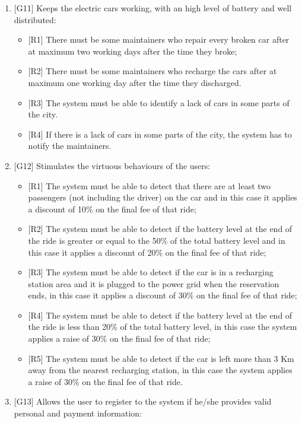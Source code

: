\begin{enumerate}
\item {[G11]} Keeps the electric cars working, with an high level of battery and well distributed:

\begin{itemize}
	\item {[R1]} There must be some maintainers who repair every broken car after at maximum two working days after the time they broke;
	\item {[R2]} There must be some maintainers who recharge the cars after at maximum one working day after the time they discharged.
	\item {[R3]} The system must be able to identify a lack of cars in some parts of the city.
	\item {[R4]} If there is a lack of cars in some parts of the city, the system has to notify the maintainers.
\end{itemize}

\item {[G12]} Stimulates the virtuous behaviours of the users:

\begin{itemize}
	\item {[R1]} The system must be able to detect that there are at least two passengers (not including the driver) on the car and in this case it applies a discount of 10\% on the final fee of that ride;
	\item {[R2]} The system must be able to detect if the battery level at the end of the ride is greater or equal to the 50\% of the total battery level and in this case it applies a discount of 20\% on the final fee of that ride;
	\item {[R3]} The system must be able to detect if the car is in a recharging station area and it is plugged to the power grid when the reservation ends, in this case it applies a discount of 30\% on the final fee of that ride;
	\item {[R4]} The system must be able to detect if the battery level at the end of the ride is less than 20\% of the total battery level, in this case the system applies a raise of 30\% on the final fee of that ride;
	\item {[R5]} The system must be able to detect if the car is left more than 3 Km away from the nearest recharging station, in this case the system applies a raise of 30\% on the final fee of that ride.
\end{itemize}

\item {[G13]} Allows the user to register to the system if he/she provides valid personal and payment information:


\end{enumerate}
